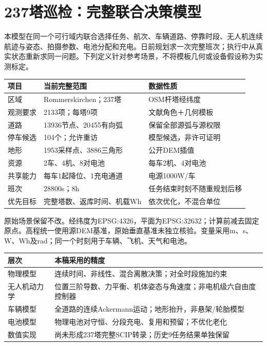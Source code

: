 \section{237塔巡检：完整联合决策模型}
\noindent 本模型在同一个可行域内联合选择任务、航次、车辆道路、停靠时段、无人机连续航迹与姿态、拍摄参数、电池分配和充电。日前规划求一次完整班次；执行中从真实状态重新求同一问题。下列定义针对参考场景，不将模板几何或设备假设称为实测标定。
\begin{center}\small
\begin{tabular}{p{.26\linewidth}p{.36\linewidth}p{.28\linewidth}}\toprule
项目 & 当前完整范围 & 数据性质\\\midrule
区域 & Rommerskirchen；237塔 & OSM杆塔经纬度\\
观测要求 & 2133项；每塔9项 & 文献角色＋几何模板\\
道路 & 13936节点、20455有向弧 & 保留全部源弧与源权限\\
停车候选 & 104个；允许重访 & 模型候选，非许可证明\\
地形 & 1953采样点、3886三角形 & 公开DEM插值\\
资源 & 2车、4机、8对电池 & 每车2机、4对电池\\
共享能力 & 每车1起降位、1充电通道 & 电源1000W/车\\
班次 & 28800s；8h & 任务结束时刻不随重规划后移\\
优先目标 & 完整塔数、返库时间、机载Wh & 依次优化，不混合单位\\\bottomrule
\end{tabular}\end{center}
\noindent 原始场景保留不改。经纬度为EPSG:4326，平面为EPSG:32632；计算前减去固定原点。高程统一使用源DEM基准，原始垂直基准未独立核验。变量采用m、s、W、Wh及rad；同一个时刻用于车辆、飞机、天气和电池。
\begin{center}\small
\begin{tabular}{p{.29\linewidth}p{.61\linewidth}}\toprule
层次 & 本稿采用的精度\\\midrule
物理模型 & 连续时间、非线性、混合离散决策；对全时段施加约束\\
无人机动力学 & 位置三阶导数、力平衡、机体姿态与角速度；非电机级六自由度控制器\\
车辆模型 & 全道路的连续Ackermann运动；地形抬升，非悬架/轮胎模型\\
电池模型 & 物理电池对守恒、分段充电、复用和预留；不优化老化\\
数值实现 & 尚未形成237塔完整SCIP转录；历史9任务结果单独保留\\\bottomrule
\end{tabular}\end{center}
\clearpage

